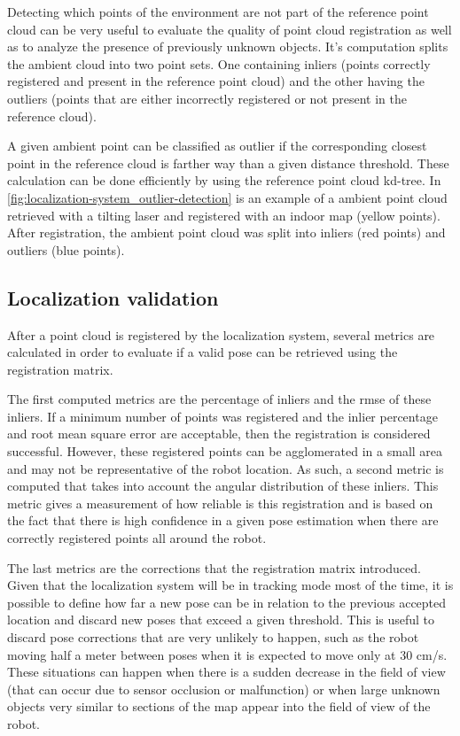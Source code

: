 Detecting which points of the environment are not part of the reference point cloud can be very useful to evaluate the quality of point cloud registration as well as to analyze the presence of previously unknown objects. It's computation splits the ambient cloud into two point sets. One containing inliers (points correctly registered and present in the reference point cloud) and the other having the outliers (points that are either incorrectly registered or not present in the reference cloud).

A given ambient point can be classified as outlier if the corresponding closest point in the reference cloud is farther way than a given distance threshold. These calculation can be done efficiently by using the reference point cloud kd-tree. In \cref{fig:localization-system_outlier-detection} is an example of a ambient point cloud retrieved with a tilting laser and registered with an indoor map (yellow points). After registration, the ambient point cloud was split into inliers (red points) and outliers (blue points).


\subsection{Localization validation}

After a point cloud is registered by the localization system, several metrics are calculated in order to evaluate if a valid pose can be retrieved using the registration matrix.

The first computed metrics are the percentage of inliers and the \gls{rmse} of these inliers. If a minimum number of points was registered and the inlier percentage and root mean square error are acceptable, then the registration is considered successful. However, these registered points can be agglomerated in a small area and may not be representative of the robot location. As such, a second metric is computed that takes into account the angular distribution of these inliers. This metric gives a measurement of how reliable is this registration and is based on the fact that there is high confidence in a given pose estimation when there are correctly registered points all around the robot.

The last metrics are the corrections that the registration matrix introduced. Given that the localization system will be in tracking mode most of the time, it is possible to define how far a new pose can be in relation to the previous accepted location and discard new poses that exceed a given threshold. This is useful to discard pose corrections that are very unlikely to happen, such as the robot moving half a meter between poses when it is expected to move only at 30 cm/s. These situations can happen when there is a sudden decrease in the field of view (that can occur due to sensor occlusion or malfunction) or when large unknown objects very similar to sections of the map appear into the field of view of the robot.

